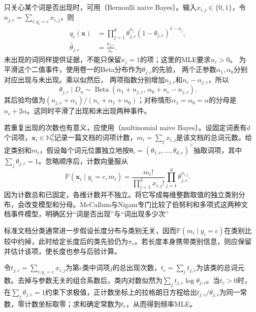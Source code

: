 只关心某个词是否出现时，可用（Bernoulli naive Bayes）。输入$x_{i,j}\in\{0,1\}$，令$n_{j,c}=\sum_{i:y_i=c}x_{i,j}$，则
\begin{equation}
  \label{eq:classification-naive-bayes-bernoulli}
  \begin{aligned}
    q_c(\bm{x})
      &=\prod_{j=1}^{d}
        \theta_{j,c}^{x_j}(1-\theta_{j,c})^{1-x_j},\\
    \hat\theta_{j,c}&=\frac{n_{j,c}}{n_c}.
  \end{aligned}
\end{equation}
未出现的词同样提供证据，不能只保留$x_j=1$的项；这里的MLE要求$n_c>0$。
为平滑这个二值事件，使用卷一的Beta分布作为$\theta_{j,c}$的先验，
两个正参数$\alpha_1,\alpha_0$分别对应出现与未出现。乘以似然后，
两项指数分别增加$n_{j,c}$和$n_c-n_{j,c}$，所以
\[
  \theta_{j,c}\mid D_n
  \sim\operatorname{Beta}
    (\alpha_1+n_{j,c},\,\alpha_0+n_c-n_{j,c}).
\]
其后验均值为$(n_{j,c}+\alpha_1)/(n_c+\alpha_1+\alpha_0)$；对称情形$\alpha_1=\alpha_0=\alpha$的分母是$n_c+2\alpha$。这同时平滑了出现和未出现两种事件。

若重复出现的次数也有意义，应使用（multinomial naive Bayes）。设固定词表有$d$个词项，$\bm{x}_i\in\mathbb{N}_0^d$记录一篇文档的词项计数，$m_i=\sum_jx_{i,j}$是该文档的总词元数。给定类别和$m_i$，假设每个词元位置独立地按$\bm{\theta}_c=(\theta_{1,c},\ldots,\theta_{d,c})^{\top}$抽取词项，其中$\sum_j\theta_{j,c}=1$。忽略顺序后，计数向量服从
\begin{equation}
  \label{eq:classification-naive-bayes-multinomial}
  \mathbb{P}(\bm{x}_i\mid y_i=c,m_i)
  =\frac{m_i!}{\prod_{j=1}^{d}x_{i,j}!}
    \prod_{j=1}^{d}\theta_{j,c}^{x_{i,j}}.
\end{equation}
因为计数总和已固定，各维计数并不独立。将它写成每维整数取值的独立类别分布，会改变模型和分母。McCallum与Nigam专门比较了伯努利和多项式这两种文档事件模型，明确区分“词是否出现”与“词出现多少次”

标准文档分类通常进一步假设长度分布与类别无关，因而$\mathbb{P}(m_i\mid y_i=c)$在类别比较中约掉，此时给定长度后的类先验仍为$\pi_c$。若长度本身携带类别信息，则应保留并估计该项，使长度也参与后验计算。

令$t_{j,c}=\sum_{i:y_i=c}x_{i,j}$为第$c$类中词项$j$的总出现次数，$t_c=\sum_jt_{j,c}$为该类的总词元数。去掉与参数无关的组合系数后，类内对数似然为$\sum_jt_{j,c}\log\theta_{j,c}$。当$t_c>0$时，在$\sum_j\theta_{j,c}=1$约束下求极值，正计数坐标上的拉格朗日方程给出$t_{j,c}/\theta_{j,c}$为同一常数，零计数坐标取零；求和确定常数为$t_c$，从而得到频率MLE。

